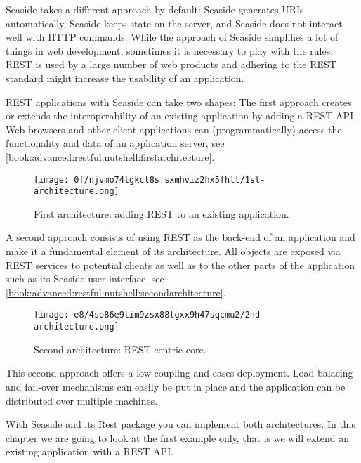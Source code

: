 \documentclass[a4paper,10pt,twoside]{book}
\begin{document}
Seaside takes a different approach by default: Seaside generates URIs automatically, Seaside keeps state on the server, and Seaside does not interact well with HTTP commands. While the approach of Seaside simplifies a lot of things in web development, sometimes it is necessary to play with the rules. REST is used by a large number of web products and adhering to the REST standard might increase the usability of an application.

REST applications with Seaside can take two shapes: The first approach creates or extends the interoperability of an existing application by adding a REST API. Web browsers and other client applications can (programmatically) access the functionality and data of an application server, see \autoref{book:advanced:restful:nutshell:firstarchitecture}.

\begin{figure}[h!tbp]
	\begin{center}
		\texttt{[image: 0f/njvmo74lgkcl8sfsxmhviz2hx5fhtt/1st-architecture.png]}
		\caption{First architecture: adding REST to an existing application.\label{book:advanced:restful:nutshell:firstarchitecture}}
	\end{center}
\end{figure}


A second approach consists of using REST as the back-end of an application and make it a fundamental element of its architecture. All objects are exposed via REST services to potential clients as well as to the other parts of the application such as its Seaside user-interface, see \autoref{book:advanced:restful:nutshell:secondarchitecture}.

\begin{figure}[h!tbp]
	\begin{center}
		\texttt{[image: e8/4so86e9tim9zsx88tgxx9h47sqcmu2/2nd-architecture.png]}
		\caption{Second architecture:  REST centric core.\label{book:advanced:restful:nutshell:secondarchitecture}}
	\end{center}
\end{figure}


This second approach offers a low coupling and eases deployment. Load-balacing and fail-over mechanisms can easily be put in place and the application can be distributed over multiple machines.

With Seaside and its Rest package you can implement both architectures. In this chapter we are going to look at the first example only, that is we will extend an existing application with a REST API.
\end{document}
